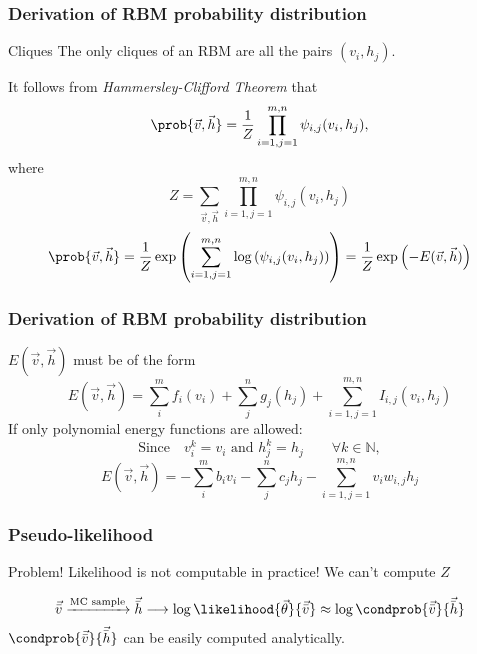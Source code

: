
\begin{frame}[noframenumbering]
  \frametitle{Derivation of RBM probability distribution}
  \begin{alertblock}{Cliques}
    The only cliques of an RBM are all the pairs \((v_i,h_j)\).
  \end{alertblock}
  It follows from \emph{Hammersley-Clifford Theorem}\cite{fischer2012introduction} that 
  \[\prob{\vec{v}, \vec{h}} = \frac{1}{Z} \prod_{i=1,j=1}^{m,n} \psi_{i,j}(v_i, h_j),\]
  where
  \[Z = \sum_{\vec{v}, \vec{h}}\prod_{i=1,j=1}^{m,n} \psi_{i,j}(v_i, h_j)\]
  \pause
  \[
  \prob{\vec{v}, \vec{h}} 
  = \frac{1}{Z} \exp\left(\sum_{i=1,j=1}^{m,n}\log\left(\psi_{i,j}(v_i, h_j)\right)\right)
  = \frac{1}{Z} \exp\left(-E(\vec{v}, \vec{h})\right)
  \]
\end{frame}

\begin{frame}[noframenumbering]
  \frametitle{Derivation of RBM probability distribution}
  \(E(\vec{v}, \vec{h})\) must be of the form
  \[
  E(\vec{v}, \vec{h}) = \sum_{i}^m f_i{(v_i)} + \sum_{j}^n g_j{(h_j)} +
  \sum_{i=1,j=1}^{m,n} I_{i,j}{(v_i,h_j)}
  \]
  \pause
  If only polynomial energy functions are allowed:
  \[\text{Since}\quad v_i^k =  v_i \text{ and } h_j^k=h_j \qquad \forall k \in \mathds{N},\]
  \[
  E(\vec{v}, \vec{h}) = -\sum_{i}^m b_i v_i - \sum_{j}^n c_j h_j -
  \sum_{i=1,j=1}^{m,n} v_i w_{i,j} h_j
  \]
\end{frame}

\begin{frame}
  \frametitle{Pseudo-likelihood}
  
  \begin{alertblock}{Problem!}
    Likelihood is not computable in practice! We can't compute \(Z\)
  \end{alertblock}
  \pause
  \[
  \vec{\bar{v}} \xrightarrow{\text{MC sample}} \vec{\bar{h}} \longrightarrow \log\likelihood{\vec{\theta}}{\vec{\bar{v}}} \approx \log{\condprob{\vec{\bar{v}}}{\vec{\bar{h}}}}
  \]
  \(\condprob{\vec{\bar{v}}}{\vec{\bar{h}}}\) can be easily computed analytically.
\end{frame}